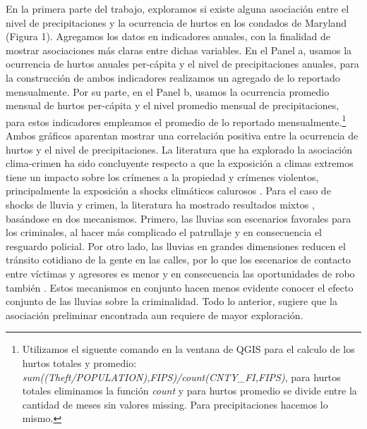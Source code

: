 \documentclass[11pt,a4paper]{article}
\begin{document}
En la primera parte del trabajo, exploramos si existe alguna asociación entre el nivel de precipitaciones y la ocurrencia de hurtos en los condados de Maryland (Figura 1). Agregamos los datos en indicadores anuales, con la finalidad de mostrar asociaciones más claras entre dichas variables. En el Panel a, usamos la ocurrencia de hurtos anuales per-cápita y el nivel de precipitaciones anuales, para la construcción de ambos indicadores realizamos un agregado de lo reportado mensualmente. Por su parte, en el Panel b, usamos la ocurrencia promedio mensual de hurtos per-cápita y el nivel promedio mensual de precipitaciones, para estos indicadores empleamos el promedio de lo reportado mensualmente.\footnote{Utilizamos el siguente comando en la ventana de QGIS para el calculo de los hurtos totales y promedio:
\emph{sum((Theft/POPULATION),FIPS)/count(CNTY\_FI,FIPS)}, para hurtos totales eliminamos la función \emph{count} y para hurtos promedio se divide entre la cantidad de meses sin valores missing. Para precipitaciones hacemos lo mismo.}
\\
Ambos gráficos aparentan mostrar una correlación positiva entre la ocurrencia de hurtos y el nivel de precipitaciones. La literatura que ha explorado la asociación clima-crimen ha sido concluyente respecto a que la exposición a climas extremos tiene un impacto sobre los crímenes a la propiedad y crímenes violentos, principalmente la exposición a shocks climáticos calurosos \cite{blakeslee_weather_2018,cohn_weather_1990,trujillo_effect_2021}. Para el caso de shocks de lluvia y crimen, la literatura ha mostrado resultados mixtos \cite{blakeslee_weather_2018,field_effect_1992,schutte_influence_2018}, basándose en dos mecanismos. Primero, las lluvias son escenarios favorales para los criminales, al hacer más complicado el patrullaje y en consecuencia el resguardo policial. Por otro lado, las lluvias en grandes dimensiones reducen el tránsito cotidiano de la gente en las calles, por lo que los escenarios de contacto entre víctimas y agresores es menor y en consecuencia las oportunidades de robo también \cite{field_effect_1992}. Estos mecanismos en conjunto hacen menos evidente conocer el efecto conjunto de las lluvias sobre la criminalidad. Todo lo anterior, sugiere que la asociación preliminar encontrada aun requiere de mayor exploración.
\end{document}
